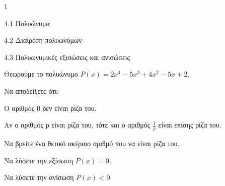 \begin{ylh}{1}
\item 4.1 Πολυώνυμα
\item 4.2 Διαίρεση πολυωνύμων
\item 4.3 Πολυωνυμικές εξισώσεις και ανισώσεις
\end{ylh}
Θεωρούμε το πολυώνυμο $P(x) = 2x^4 - 5x^3 + 4x^2 - 5x + 2$.
\begin{alist}
\item Να αποδείξετε ότι:
\end{alist}
\begin{alist}
\item
  Ο αριθμός 0 δεν είναι ρίζα του.
\item
  Αν ο αριθμός ρ είναι ρίζα του, τότε και ο αριθμός $\frac{1}{\rho}$ είναι επίσης ρίζα του.
\item Να βρείτε ένα θετικό ακέραιο αριθμό που να είναι ρίζα του.
\item Να λύσετε την εξίσωση $P(x) = 0$.
\item Να λύσετε την ανίσωση $P(x) < 0$.
\end{alist}

